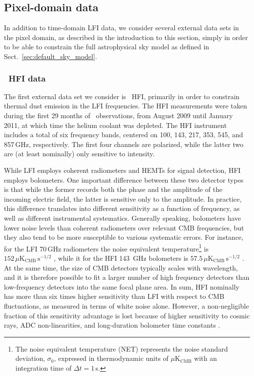 \documentclass[twocolumn]{aa}
\begin{document}
\subsection{Pixel-domain data}

In addition to time-domain LFI data, we consider several external data
sets in the pixel domain, as described in the introduction to this
section, simply in order to be able to constrain the full
astrophysical sky model as defined in
Sect.~\ref{sec:default_sky_model}.

\subsubsection{\Planck\ HFI data}

The first external data set we consider is \Planck\ HFI, primarily in
order to constrain thermal dust emission in the LFI frequencies. The
HFI measurements were taken during the first 29 months of
\Planck\ observations, from August 2009 until January 2011, at which
time the helium coolant was depleted. The HFI instrument includes a
total of six frequency bands, centered on 100, 143, 217, 353, 545, and
857\,GHz, respectively. The first four channels are polarized, while
the latter two are (at least nominally) only sensitive to intensity.

While LFI employs coherent radiometers and HEMTs for signal detection,
HFI employs bolometers. One important difference between these two
detector types is that while the former records both the phase and the
amplitude of the incoming electric field, the latter is sensitive only
to the amplitude. In practice, this difference translates into
different sensitivity as a function of frequency, as well as different
instrumental systematics. Generally speaking, bolometers have lower
noise levels than coherent radiometers over relevant CMB frequencies,
but they also tend to be more susceptible to various systematic
errors. For instance, for the LFI 70\,GHz radiometers the noise
equivalent temperature\footnote{The noise equivalent temperature (NET)
  represents the noise standard deviation, $\sigma_0$, expressed in
  thermodynamic units of $\mu\mathrm{K}_{\mathrm{CMB}}$ with an
  integration time of $\Delta t=1$\,s.} is
$152\,\mu\mathrm{K}_{\mathrm{CMB}}\,\mathrm{s}^{-1/2}$
\citep{planck2014-a03}, while it for the HFI 143~GHz bolometers is
$57.5\,\mu\mathrm{K}_{\mathrm{CMB}}\,\mathrm{s}^{-1/2}$
\citep{planck2014-a08}. At the same time, the size of CMB detectors
typically scales with wavelength, and it is therefore possible to fit
a larger number of high frequency detectors than low-frequency
detectors into the same focal plane area. In sum, HFI nominally has
more than six times higher sensitivity than LFI with respect to CMB
fluctuations, as measured in terms of white noise alone. However, a
non-negligible fraction of this sensitivity advantage is lost because
of higher sensitivity to cosmic rays, ADC non-linearities, and
long-duration bolometer time constants \citep{planck2016-l03}.
\end{document}
